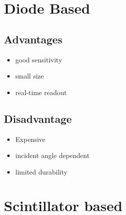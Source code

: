 \documentclass{article}
\begin{document}
\begin{multicols}{2}
\section{Diode Based}

\subsection{Advantages}
\begin{itemize}
    \item good sensitivity
    \item small size
    \item real-time readout
\end{itemize}

\subsection{Disadvantage}
\begin{itemize}
    \item Expensive
    \item incident angle dependent
    \item limited durability
\end{itemize}

\section{Scintillator based}


\end{multicols}
\end{document}

